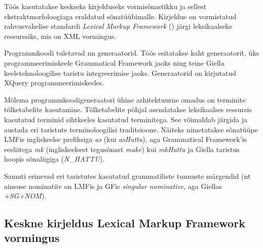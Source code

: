 \documentclass[12pt,a4paper]{article}
\begin{document}
Töös kasutatakse keskseks kirjelduseks vormisõnastikku ja sellest ekstrakt\-morfoloogiaga eraldatud sõnatüübi\-malle. Kirjeldus on vormistatud rahvusvahelise standardi \textit{Lexical Markup Framework} (\cite{iso/tc_37/sc_4_language_2007}) järgi leksikaalseks ressurssiks, mis on XML vormingus.

Programmkoodi tuletavad nn generaatorid. Töös esitatakse kaht generaatorit, üks programmeerimiskeele Grammatical Framework jaoks ning teine Giella keeletehnoloogilise taristu integreerimise jaoks. Generaatorid on kirjutatud XQuery programmeerimiskeeles.

Mõlema programmkoodi\-generaatori ühine arhitektuurne omadus on terminite tõlke\-tabelite kasutamine. Tõlke\-tabelite põhjal asendatakse leksikaalses ressursis kasutatud terminid sihtkeeles kasutatud terminitega. See võimaldab järgida ja austada eri taristute terminoloogilisi traditsioone. Näiteks nimetatakse sõnatüüpe LMFis ingliskeelse prefiksiga \textit{as} (kui \textit{asHattu}), aga Grammatical Framework'is eesliitega \textit{mk} (inglis\-keelsest tegusõnast \textit{make}) kui \textit{mkHattu} ja Giella taristus hoopis sõnaliigiga (\textit{N\_HATTU}).

Samuti erinevad eri taristutes kasutatud grammatiliste tunnuste märgendid (nt ainsuse nominatiiv on LMFis ja GFis \textit{singular nominative}, aga Giellas \textit{+SG+NOM}).



\subsection{Keskne kirjeldus Lexical Markup Framework vormingus}
\label{sec:lmf}
\end{document}
